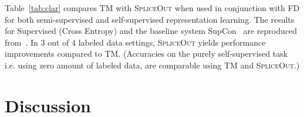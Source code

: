 \documentclass{article}
\newcommand{\SpA}{{\textsc{SpliceOut}}\xspace}
\begin{document}
Table~\ref{tab:clar} compares TM with \SpA when used in conjunction with FD for both semi-supervised and self-supervised representation learning. The results for Supervised (Cross Entropy) and the baseline system SupCon~\citep{supcon} are reproduced from~\citep{clar}. In 3 out of 4 labeled data settings, \SpA yields performance improvements compared to TM. (Accuracies on the purely self-supervised task i.e. using zero amount of labeled data, are comparable using TM and \SpA.)



\section{Discussion}
\end{document}
